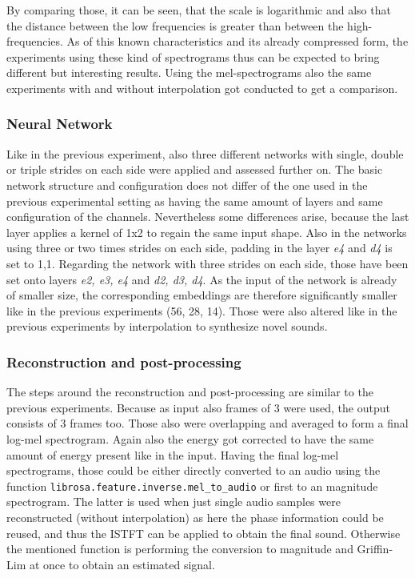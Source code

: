 By comparing those, it can be seen, that the scale is logarithmic and also that the distance between the low frequencies is greater than between the high-frequencies. As of this known characteristics and its already compressed form, the experiments using these kind of spectrograms thus can be expected to bring different but interesting results. Using the mel-spectrograms also the same experiments with and without interpolation got conducted to get a comparison.

\subsubsection{Neural Network}
Like in the previous experiment, also three different networks with single, double or triple strides on each side were applied and assessed further on. The basic network structure and configuration does not differ of the one used in the previous experimental setting as having the same amount of layers and same configuration of the channels. Nevertheless some differences arise, because the last layer applies a kernel of 1x2 to regain the same input shape. Also in the networks using three or two times strides on each side, padding in the layer \textit{e4} and \textit{d4} is set to 1,1. Regarding the network with three strides on each side, those have been set onto layers \textit{e2, e3, e4} and \textit{d2, d3, d4}. As the input of the network is already of smaller size, the corresponding embeddings are therefore significantly smaller like in the previous experiments (56, 28, 14). Those were also altered like in the previous experiments by interpolation to synthesize novel sounds. 

\subsubsection{Reconstruction and post-processing}
The steps around the reconstruction and post-processing are similar to the previous experiments. Because as input also frames of 3 were used, the output consists of 3 frames too. Those also were overlapping and averaged to form a final log-mel spectrogram. Again also the energy got corrected to have the same amount of energy present like in the input. Having the final log-mel spectrograms, those could be either directly converted to an audio using the function \texttt{librosa.feature.inverse.mel\_to\_audio} or first to an magnitude spectrogram. The latter is used when just single audio samples were reconstructed (without interpolation) as here the phase information could be reused, and thus the ISTFT can be applied to obtain the final sound. Otherwise the mentioned function is performing the conversion to magnitude and Griffin-Lim at once to obtain an estimated signal. 


